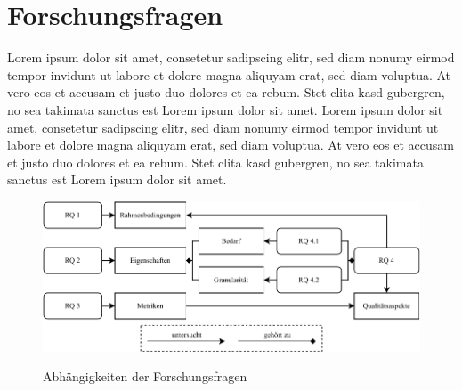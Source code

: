 \section{Forschungsfragen}

Lorem ipsum dolor sit amet, consetetur sadipscing elitr, sed diam nonumy eirmod tempor invidunt ut labore et dolore magna aliquyam erat, sed diam voluptua. At vero eos et accusam et justo duo dolores et ea rebum. Stet clita kasd gubergren, no sea takimata sanctus est Lorem ipsum dolor sit amet. Lorem ipsum dolor sit amet, consetetur sadipscing elitr, sed diam nonumy eirmod tempor invidunt ut labore et dolore magna aliquyam erat, sed diam voluptua. At vero eos et accusam et justo duo dolores et ea rebum. Stet clita kasd gubergren, no sea takimata sanctus est Lorem ipsum dolor sit amet.

\begin{figure}
    \includegraphics{contents/03_research_design/res/research_questions_overview.pdf}
    \label{fig:research_questions_overview}
    \caption{Abhängigkeiten der Forschungsfragen}
\end{figure}

\noindent{}

\noindent{}

\noindent{}

\noindent{}

\noindent{}